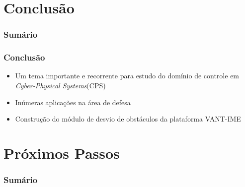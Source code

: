 \documentclass{beamer}
\begin{document}
\section{Conclusão}

\begin{frame}
	\frametitle{Sumário}
	\tableofcontents[currentsection]
\end{frame}

\begin{frame}
	
	\frametitle{Conclusão}
	
	\begin{itemize}	
		
		\item  Um tema importante e recorrente para estudo do domínio de controle em \textit{Cyber-Physical Systems}(CPS) 
		
		
		\item Inúmeras aplicações na área de defesa
		
		\item Construção do módulo de desvio de obstáculos da plataforma VANT-IME 
		
		
	\end{itemize}	
	
	
\end{frame}	

\section{Próximos Passos}

\begin{frame}
	\frametitle{Sumário}
	\tableofcontents[currentsection]
\end{frame}
\end{document}
